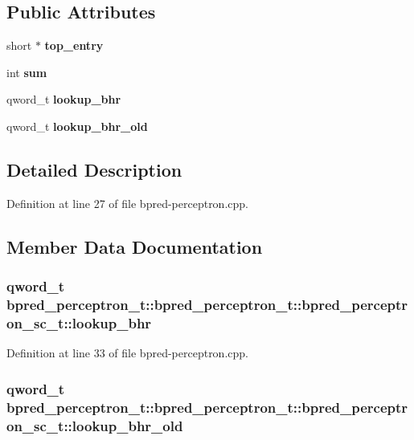 \subsection*{Public Attributes}
\begin{CompactItemize}
\item 
short $\ast$ {\bf top\_\-entry}
\item 
int {\bf sum}
\item 
qword\_\-t {\bf lookup\_\-bhr}
\item 
qword\_\-t {\bf lookup\_\-bhr\_\-old}
\end{CompactItemize}


\subsection{Detailed Description}


Definition at line 27 of file bpred-perceptron.cpp.

\subsection{Member Data Documentation}
\subsubsection[{lookup\_\-bhr}]{\setlength{\rightskip}{0pt plus 5cm}qword\_\-t bpred\_\-perceptron\_\-t::bpred\_\-perceptron\_\-t::bpred\_\-perceptron\_\-sc\_\-t::lookup\_\-bhr}\label{classbpred__perceptron__t_1_1bpred__perceptron__sc__t_fb9206d9e607cc0ffa00701b89e75185}




Definition at line 33 of file bpred-perceptron.cpp.
\subsubsection[{lookup\_\-bhr\_\-old}]{\setlength{\rightskip}{0pt plus 5cm}qword\_\-t bpred\_\-perceptron\_\-t::bpred\_\-perceptron\_\-t::bpred\_\-perceptron\_\-sc\_\-t::lookup\_\-bhr\_\-old}\label{classbpred__perceptron__t_1_1bpred__perceptron__sc__t_0dede2d36f22d9a149db1e8def593410}




